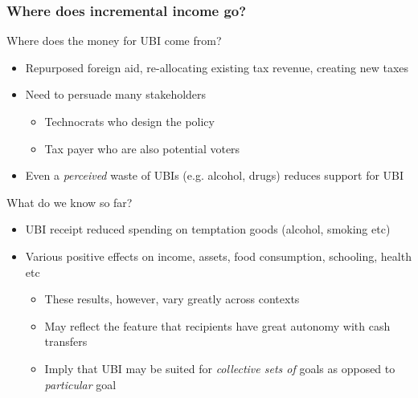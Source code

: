 \documentclass[aspectratio=169]{beamer}
\begin{document}
\begin{frame}
\frametitle{Where does incremental income go?} 
Where does the money for UBI come from?
\begin{itemize}\setlength\itemsep{3pt}
\item Repurposed foreign aid, re-allocating existing tax revenue, creating new taxes
\item Need to persuade many stakeholders
\begin{itemize}\setlength\itemsep{3pt}
\item Technocrats who design the policy
\item Tax payer who are also potential voters
\end{itemize}
\item Even a \textit{perceived} waste of UBIs (e.g. alcohol, drugs) reduces support for UBI
\end{itemize}\medskip
What do we know so far?
\begin{itemize}\setlength\itemsep{3pt}
\item UBI receipt reduced spending on temptation goods (alcohol, smoking etc)
\item Various positive effects on income, assets, food consumption, schooling, health etc
\begin{itemize}\setlength\itemsep{3pt}
\item These results, however, vary greatly across contexts
\item May reflect the feature that recipients have great autonomy with cash transfers
\item Imply that UBI may be suited for \textit{collective sets of} goals as opposed to \textit{particular} goal
\end{itemize}
\end{itemize}
\end{frame}
\end{document}
